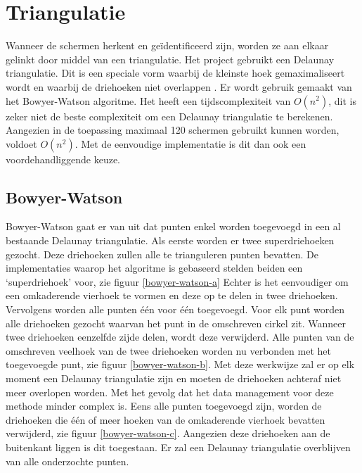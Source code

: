 \section{Triangulatie} \label{sec:triangulatie}
Wanneer de schermen herkent en geïdentificeerd zijn, worden ze aan elkaar gelinkt door middel van een triangulatie. Het project gebruikt een Delaunay triangulatie. Dit is een speciale vorm waarbij de kleinste hoek gemaximaliseert wordt en waarbij de driehoeken niet overlappen \cite{delaunaywiki}.
Er wordt gebruik gemaakt van het Bowyer-Watson algoritme. \cite{Bowyer-WatsonWiki} Het heeft een tijdscomplexiteit van $O(n^2)$, dit is zeker niet de beste complexiteit om een Delaunay triangulatie te berekenen. Aangezien in de toepassing maximaal 120 schermen gebruikt kunnen worden, voldoet $O(n^2)$. Met de eenvoudige implementatie is dit dan ook een voordehandliggende keuze.

\subsection{Bowyer-Watson}
Bowyer-Watson gaat er van uit dat punten enkel worden toegevoegd in een al bestaande Delaunay triangulatie. Als eerste worden er twee superdriehoeken gezocht. Deze driehoeken zullen alle te trianguleren punten bevatten. De implementaties waarop het algoritme is gebaseerd \cite{Bowyer-WatsonWiki} \cite{bowyer-watsonImplementation} stelden beiden een `superdriehoek' voor, zie figuur \ref{bowyer-watson-a} Echter is het eenvoudiger om een omkaderende vierhoek te vormen en deze op te delen in twee driehoeken. Vervolgens worden alle punten één voor één toegevoegd.
\bigskip
Voor elk punt worden alle driehoeken gezocht waarvan het punt in de omschreven cirkel zit. Wanneer twee driehoeken eenzelfde zijde delen, wordt deze verwijderd. Alle punten van de omschreven veelhoek van de twee driehoeken worden nu verbonden met het toegevoegde punt, zie figuur \ref{bowyer-watson-b}. Met deze werkwijze zal er op elk moment een Delaunay triangulatie zijn en moeten de driehoeken achteraf niet meer overlopen worden. Met het gevolg dat het data management voor deze methode minder complex is.
\bigskip
Eens alle punten toegevoegd zijn, worden de driehoeken die één of meer hoeken van de omkaderende vierhoek bevatten verwijderd, zie figuur \ref{bowyer-watson-c}. Aangezien deze driehoeken aan de buitenkant liggen is dit toegestaan. Er zal een Delaunay triangulatie overblijven van alle onderzochte punten.

